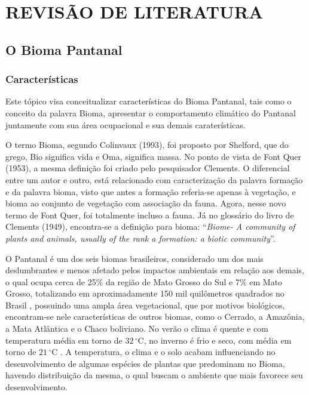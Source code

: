 
\chapter{REVISÃO DE LITERATURA}
\label{chap:fundamentacaoTeorica}

\section{O Bioma Pantanal}

\subsection{Características}

Este tópico visa conceitualizar características do Bioma Pantanal, tais como o conceito da palavra Bioma, apresentar o comportamento climático do Pantanal juntamente com sua área ocupacional e sua demais caraterísticas.

O termo Bioma, segundo Colinvaux (1993), foi proposto por Shelford, que do grego, Bio significa vida e  Oma, significa massa. No ponto de vista de Font Quer (1953), a mesma definição foi criado pelo pesquisador Clements. O diferencial entre um autor e outro, está relacionado com caracterização da palavra formação e da palavra bioma, visto que antes a formação referia-se apenas à vegetação, e bioma ao conjunto de vegetação com associação da fauna. Agora, nesse novo termo de Font Quer, foi totalmente incluso a fauna. Já no glossário do livro de Clements (1949), encontra-se a definição para bioma: “\textit{Biome- A community of plants and animals, usually of the rank a formation: a biotic community}”. 

O Pantanal é um dos seis biomas brasileiros, considerado um dos mais deslumbrantes e menos afetado pelos impactos ambientais em relação aos demais, o qual ocupa cerca de 25\% da região de Mato Grosso do Sul e 7\% em Mato Grosso, totalizando em aproximadamente 150 mil quilômetros quadrados no Brasil , possuindo uma ampla área vegetacional, que por motivos biológicos, encontram-se nele características de outros biomas, como o Cerrado, a Amazônia, a Mata Atlântica e o Chaco boliviano. No verão o clima é quente e com temperatura média em torno de $32\,^{\circ}\mathrm{C}$, no inverno é frio e seco, com média em torno de $21\,^{\circ}\mathrm{C}$ \cite{portal}. A temperatura, o clima e o solo  acabam influenciando no desenvolvimento de algumas espécies de plantas que predominam no Bioma, havendo distribuição da mesma, o qual buscam o ambiente que mais favorece seu desenvolvimento.

